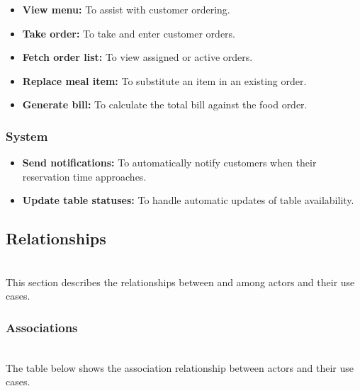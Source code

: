 \begin{itemize}
\item
\protect{}\label{nXS_EVZr91rywjwmn7lke}
\textbf{View menu:} To assist with customer ordering.
\item
\protect{}\label{GMG2ePiZcHhnKg394b7og}
\textbf{Take order:} To take and enter customer orders.
\item
\protect{}\label{eagqK_ewax4kiut9GRnMC}
\textbf{Fetch order list:} To view assigned or active orders.
\item
\protect{}\label{XbJEmrfWki289-B-wthUI}
\textbf{Replace meal item:} To substitute an item in an existing order.
\item
\protect{}\label{PnmKkc_gy4eoIMOVQpiIA}
\textbf{Generate bill:} To calculate the total bill against the food order.
\end{itemize}

\subsubsection{System}\label{z9PPBMZ9Xu_c2IWq7IroM}

\begin{itemize}
\item
\protect{}\label{SvP90YNp4nilJTnz-knW8}
\textbf{Send notifications:} To automatically notify customers when their reservation time approaches.
\item
\protect{}\label{2Q65wCmiRkEeACW7yZ2iu}
\textbf{Update table statuses:} To handle automatic updates of table availability.
\end{itemize}

\subsection{Relationships}\label{bCvJbxBPuP8uzbDVF99ff}
\\
This section describes the relationships between and among actors and their use cases.

\subsubsection{Associations}\label{mJxo-lPAEt-ItZWTmZR1m}
\\
The table below shows the association relationship between actors and their use cases.

